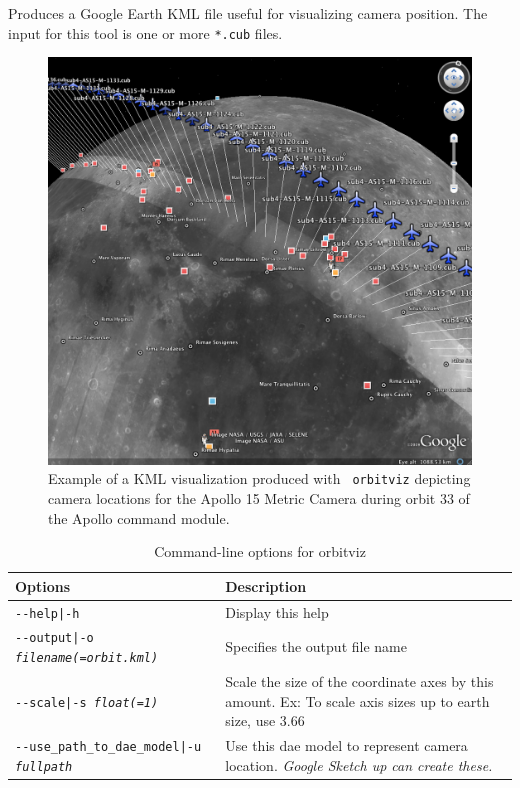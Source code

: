 Produces a Google Earth \ac{KML} file useful for visualizing camera
position. The input for this tool is one or more \texttt{*.cub} files.

\begin{figure}[!b]
  \begin{center}
  \includegraphics[width=6in]{images/orbitviz_ge_result.png}
  \end{center}
  \caption{ Example of a \ac{KML} visualization produced with {\tt
      orbitviz} depicting camera locations for the Apollo 15 Metric
    Camera during orbit 33 of the Apollo command module.}
  \label{fig:orbitviz_example}
\end{figure}

\begin{longtable}{|l|p{10cm}|}
\caption{Command-line options for orbitviz}
\label{tbl:orbitviz}
\endfirsthead
\endhead
\endfoot
\endlastfoot
\hline
Options & Description \\ \hline \hline
\texttt{-\/-help|-h} & Display this help \\ \hline
\texttt{-\/-output|-o \textit{filename(=orbit.kml)}} & Specifies the output file name \\ \hline
\texttt{-\/-scale|-s \textit{float(=1)}} & Scale the size of the coordinate axes by this amount. Ex: To scale axis sizes up to earth size, use 3.66 \\ \hline
\texttt{-\/-use\_path\_to\_dae\_model|-u \textit{fullpath}} & Use this dae model to represent camera location. \emph{Google Sketch up can create these.} \\ \hline
\end{longtable}

